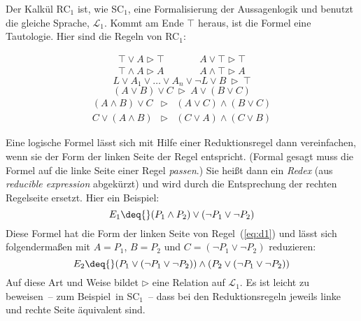 Der Kalkül RC$_1$ ist, wie SC$_1$, eine Formalisierung der Aussagenlogik und
benutzt die gleiche Sprache, $\mathcal{L}_1$.  Kommt am Ende $\top$ heraus, ist
die Formel eine Tautologie.  Hier sind die Regeln von RC$_1$:
%
\begin{definition}
\begin{eqnarray}
    \top\vee A\triangleright \top &\qquad& A\vee\top \triangleright\top\label{eq:e1}\\%
    \top\wedge A\triangleright A &\qquad& A\wedge\top\triangleright A\label{eq:e2}%
\end{eqnarray}
\begin{equation}
  L\vee A_1\vee\ldots \vee A_n\vee\neg L\vee B\:\triangleright\: \top\label{eq:t}%
\end{equation}
\begin{equation}
  (A\vee B)\vee C\:\triangleright\: A\vee(B\vee C)\label{eq:a}%
\end{equation}
\begin{eqnarray}
  (A\wedge B)\vee C&\triangleright& (A\vee C)\wedge (B\vee C)\label{eq:d1}\\%
  C\vee(A\wedge B)&\triangleright& (C\vee A)\wedge (C\vee B)\label{eq:d2}%
\end{eqnarray}
\end{definition}
%
Eine logische Formel lässt sich
mit Hilfe einer Reduktionsregel dann vereinfachen, wenn sie der Form
der linken Seite der Regel entspricht.  (Formal gesagt muss die Formel
auf die linke Seite einer Regel \textit{passen}.)  
Sie heißt dann ein \emph{Redex} (aus
\emph{reducible expression} abgekürzt) und wird durch die
Entsprechung der rechten Regelseite ersetzt.  Hier ein Beispiel:
%
\begin{displaymath}
  E_1 \deq{} (P_1\wedge P_2)\vee (\neg
    P_1\vee \neg P_2)
\end{displaymath}
%
Diese Formel hat die Form der linken Seite von Regel~(\ref{eq:d1}) und lässt
sich folgendermaßen mit $A=P_1$,
$B=P_2$ und $C=(\neg P_1\vee\neg{P_2})$
reduzieren:
%
\begin{displaymath}
  E_2 \deq{} (P_1\vee(\neg P_1\vee\neg{P_2}))\wedge 
  (P_2\vee(\neg P_1\vee\neg{P_2}))
\end{displaymath}
%
Auf
diese Art und Weise bildet $\triangleright$ eine Relation auf
$\mathcal{L}_1$.
Es ist leicht zu beweisen~-- zum Beispiel\ in SC$_1$~-- dass bei den
Reduktionsregeln jeweils linke und rechte Seite äquivalent sind.

